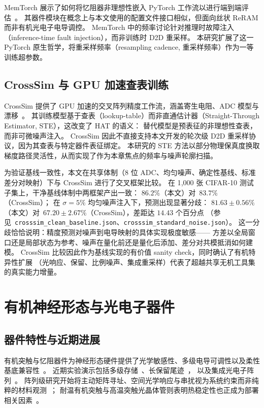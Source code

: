 MemTorch 展示了如何将忆阻器非理想性嵌入 PyTorch 工作流以进行端到端评估~\parencite{lammie2022memtorch}。
其器件模块在概念上与本文使用的配置文件接口相似，但面向丝状 ReRAM 而非有机光电子电导调控。
MemTorch 中的频率讨论针对推理时故障注入（inference-time fault injection），而非训练时 D2D 重采样。
本研究扩展了这一 PyTorch 原生哲学，将重采样频率（resampling cadence, 重采样频率）作为一等训练超参数。

\subsection{CrossSim 与 GPU 加速查表训练}

CrossSim 提供了 GPU 加速的交叉阵列精度工作流，涵盖寄生电阻、ADC 模型与漂移~\parencite{crosssim2024}。
其训练模型基于查表（lookup-table）而非直通估计器（Straight-Through Estimator, STE），这改变了 HAT 的语义：
替代模型是预表征的非理想性查表，而非可微噪声注入。
CrossSim 因此不直接支持本文开发的轮次级 D2D 重采样协议，因为其查表与特定器件表征绑定。
本研究的 STE 方法以部分物理保真度换取梯度路径灵活性，从而实现了作为本章焦点的频率与噪声轮廓扫描。

为验证基线一致性，本文在共享体制（8 位 ADC、均匀噪声、确定性基线、标准差分对映射）下与 CrossSim 进行了交叉框架比较。
在 1{,}000 张 CIFAR-10 测试子集上，干净基线体制中两框架产出一致：
$86.2\%$（本文）对~$83.7\%$（CrossSim）；
在 $\sigma=5\%$ 均匀噪声注入下，预测出现显著分歧：
$81.63\pm0.56\%$（本文）对~$67.20\pm2.67\%$（CrossSim），差距达 $14.43$ 个百分点
（参见~\texttt{crosssim\_clean\_baseline.json}、\texttt{crosssim\_standard\_noise.json}）。
这一分歧恰恰说明：精度预测对噪声到电导映射的具体实现极度敏感——
方差以全局窗口还是局部状态为参考、噪声在量化前还是量化后添加、差分对共模抵消如何建模。
CrossSim 比较因此作为基线实现的有价值 sanity check，同时确认了有机特异性扩展
（光响应、保留、比例噪声、集成重采样）代表了超越共享无机工具集的真实能力增量。

\section{有机神经形态与光电子器件}

\subsection{器件特性与近期进展}

有机突触与忆阻器件为神经形态硬件提供了光学敏感性、多级电导可调性以及柔性基底兼容性~\parencite{xu2025emerging,photonics2025organicreview,beller2024organicneurons,ji2025singleoectneuron}。
近期实验演示包括多级存储~\parencite{guo2024organic,jung2024organicfilaments}、长保留尾迹~\parencite{zeng2023organicmemristor}，
以及集成光电子阵列~\parencite{gebregiorgis2023organiccim,zhang2025opect,zhang2025mooptoelectronic,cui2025multimode}。
阵列级研究开始将主动矩阵寻址、空间光学响应与串扰视为系统约束而非纯粹的材料观测~\parencite{visionarch2023crosstalk,amspa2024insensor,jang2023insensor}；
耐温有机突触与高温突触光晶体管则表明热稳定性也正成为部署相关因素~\parencite{fuller2020tempresilient,guo2024hightemp}。

